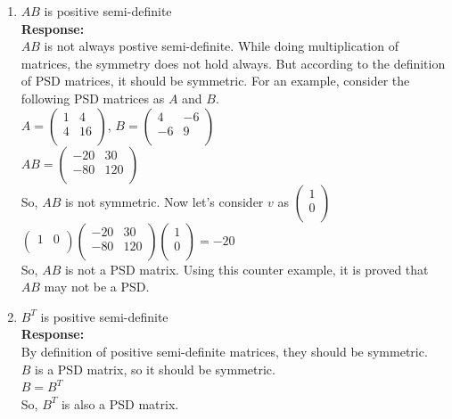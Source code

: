 \documentclass[11pt]{article}
\begin{document}
\begin{enumerate}
\begin{enumerate}
\item $AB$ is positive semi-definite\\
\textbf{Response:}\\
$AB$ is not always postive semi-definite. While doing multiplication of matrices, the symmetry does not hold always. But according to the definition of PSD matrices, it should be symmetric. For an example, consider the following PSD matrices as $A$ and $B$.\\
$A = \begin{pmatrix}1 & 4\\ 4 & 16\\\end{pmatrix}$,
$B  = \begin{pmatrix}4 & -6\\ -6 & 9\\\end{pmatrix}$\\
$AB = \begin{pmatrix}-20 & 30\\ -80 & 120\\\end{pmatrix}$\\
So, $AB$ is not symmetric. Now let's consider $v$ as $\begin{pmatrix}1\\ 0\\\end{pmatrix}$\\
$\begin{pmatrix}1 & 0\\\end{pmatrix} \begin{pmatrix}-20 & 30\\ -80 & 120\\\end{pmatrix}        \begin{pmatrix}1\\ 0\\\end{pmatrix} = -20$\\
So, $AB$ is not a PSD matrix. 
Using this counter example, it is proved that $AB$ may not be a PSD.\\

\item $B^T$ is positive semi-definite\\
\textbf{Response:}\\
By definition of positive semi-definite matrices, they should be symmetric.\\
$B$ is a PSD matrix, so it should be symmetric.\\
$B = B^T$\\
So, $B^T$ is also a PSD matrix.\\
\end{enumerate} 

\end{enumerate}
\end{document}
